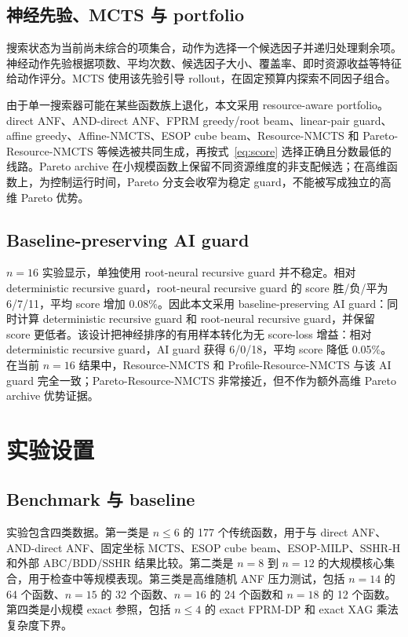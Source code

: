 \documentclass[UTF8,fontset=macnew,11pt]{ctexart}
\newcommand{\method}{Resource-NMCTS}
\newcommand{\pareto}{Pareto-Resource-NMCTS}
\begin{document}
\subsection{神经先验、MCTS 与 portfolio}

搜索状态为当前尚未综合的项集合，动作为选择一个候选因子并递归处理剩余项。神经动作先验根据项数、平均次数、候选因子大小、覆盖率、即时资源收益等特征给动作评分。MCTS 使用该先验引导 rollout，在固定预算内探索不同因子组合。

由于单一搜索器可能在某些函数族上退化，本文采用 resource-aware portfolio。direct ANF、AND-direct ANF、FPRM greedy/root beam、linear-pair guard、affine greedy、Affine-NMCTS、ESOP cube beam、\method{} 和 \pareto{} 等候选被共同生成，再按式~\eqref{eq:score} 选择正确且分数最低的线路。Pareto archive 在小规模函数上保留不同资源维度的非支配候选；在高维函数上，为控制运行时间，Pareto 分支会收窄为稳定 guard，不能被写成独立的高维 Pareto 优势。

\subsection{Baseline-preserving AI guard}

$n=16$ 实验显示，单独使用 root-neural recursive guard 并不稳定。相对 deterministic recursive guard，root-neural recursive guard 的 score 胜/负/平为 6/7/11，平均 score 增加 0.08\%。因此本文采用 baseline-preserving AI guard：同时计算 deterministic recursive guard 和 root-neural recursive guard，并保留 score 更低者。该设计把神经排序的有用样本转化为无 score-loss 增益：相对 deterministic recursive guard，AI guard 获得 6/0/18，平均 score 降低 0.05\%。在当前 $n=16$ 结果中，\method{} 和 Profile-\method{} 与该 AI guard 完全一致；\pareto{} 非常接近，但不作为额外高维 Pareto archive 优势证据。

\section{实验设置}

\subsection{Benchmark 与 baseline}

实验包含四类数据。第一类是 $n\leq 6$ 的 177 个传统函数，用于与 direct ANF、AND-direct ANF、固定坐标 MCTS、ESOP cube beam、ESOP-MILP、SSHR-H 和外部 ABC/BDD/SSHR 结果比较。第二类是 $n=8$ 到 $n=12$ 的大规模核心集合，用于检查中等规模表现。第三类是高维随机 ANF 压力测试，包括 $n=14$ 的 64 个函数、$n=15$ 的 32 个函数、$n=16$ 的 24 个函数和 $n=18$ 的 12 个函数。第四类是小规模 exact 参照，包括 $n\leq 4$ 的 exact FPRM-DP 和 exact XAG 乘法复杂度下界。
\end{document}

